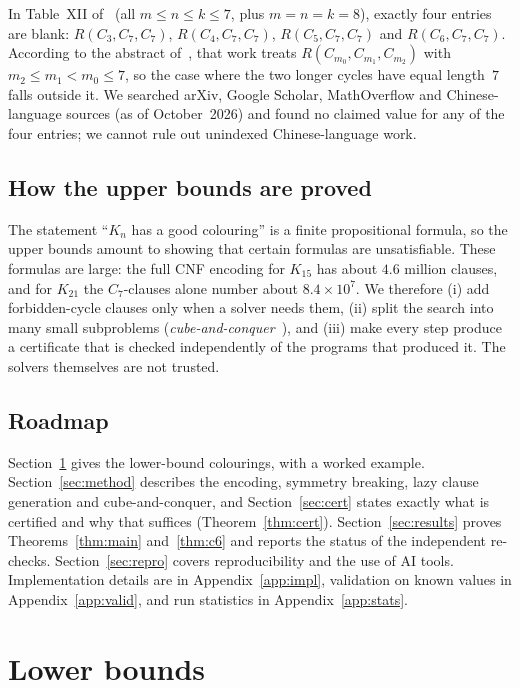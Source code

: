 \documentclass[11pt]{amsart}
\theoremstyle{definition}
\theoremstyle{remark}
\begin{document}
In Table~XII of~\cite{Rad} (all $m\le n\le k\le 7$, plus $m=n=k=8$), exactly four entries are blank: $R(C_3,C_7,C_7)$,
$R(C_4,C_7,C_7)$, $R(C_5,C_7,C_7)$ and $R(C_6,C_7,C_7)$. According to the abstract of~\cite{SunYWLX}, that work treats
$R(C_{m_0},C_{m_1},C_{m_2})$ with $m_2\le m_1<m_0\le 7$, so the case where the two longer cycles have equal length~$7$ falls
outside it. We searched arXiv, Google Scholar, MathOverflow and Chinese-language sources (as of October~2026) and found no claimed
value for any of the four entries; we cannot rule out unindexed Chinese-language work.

\subsection*{How the upper bounds are proved}
The statement ``$K_n$ has a good colouring'' is a finite propositional formula, so the upper bounds amount to showing that certain
formulas are unsatisfiable. These formulas are large: the full CNF encoding for $K_{15}$ has about $4.6$ million clauses, and for
$K_{21}$ the $C_7$-clauses alone number about $8.4\times10^7$. We therefore (i) add forbidden-cycle clauses only when a solver
needs them, (ii) split the search into many small subproblems (\emph{cube-and-conquer}~\cite{HKWB}), and (iii) make every step
produce a certificate that is checked independently of the programs that produced it. The solvers themselves are not trusted.

\subsection*{Roadmap}
Section~\ref{sec:lower} gives the lower-bound colourings, with a worked example. Section~\ref{sec:method} describes the encoding,
symmetry breaking, lazy clause generation and cube-and-conquer, and Section~\ref{sec:cert} states exactly what is certified and
why that suffices (Theorem~\ref{thm:cert}). Section~\ref{sec:results} proves Theorems~\ref{thm:main} and~\ref{thm:c6} and reports the
status of the independent re-checks. Section~\ref{sec:repro} covers reproducibility and the use of AI tools. Implementation details are
in Appendix~\ref{app:impl}, validation on known values in Appendix~\ref{app:valid}, and run statistics in Appendix~\ref{app:stats}.

\section{Lower bounds}\label{sec:lower}
\end{document}

